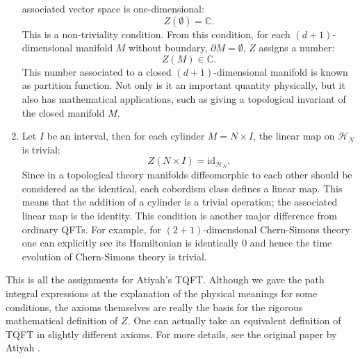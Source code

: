 \begin{enumerate}
associated vector space is one-dimensional:
\begin{equation}
  Z(\emptyset)  =  \mathbb{C}.
\end{equation}
This is a non-triviality condition. From this condition, for each $(d+1)$-dimensional
manifold $M$ without boundary, $\partial M=\emptyset$, $Z$ assigns
a number:
\begin{equation}
  Z(M)  \in  \mathbb{C}.
\end{equation}
This number associated to a closed $(d+1)$-dimensional manifold
is known as partition function. Not only is it an important quantity
physically, but it also has mathematical applications, such as giving
a topological invariant of the closed manifold $M$.
\item Let $I$ be an interval, then for each cylinder $M=N\times I$, the
linear map on $\mathcal{H}_{N}$ is trivial:
\begin{equation}
  Z(N\times I)  =  \mathrm{id}_{\mathcal{H}_{N}}.
\end{equation}
Since in a topological theory manifolds diffeomorphic to each other
should be considered as the identical, each cobordism class defines
a linear map. This means that the addition of a cylinder is a trivial
operation; the associated linear map is the identity. This condition
is another major difference from ordinary QFTs. For example, for $(2+1)$-dimensional
Chern-Simons theory one can explicitly see its Hamiltonian is identically
$0$ and hence the time evolution of Chern-Simons theory is trivial.
\end{enumerate}
%
This is all the assignments for Atiyah's TQFT. Although we gave the
path integral expressions at the explanation of the physical meanings
for some conditions, the axioms themselves are really the basis for
the rigorous mathematical definition of $Z$. One can actually take
an equivalent definition of TQFT in slightly different axioms. For
more details, see the original paper by Atiyah \cite{Atiyah:1989vu}.


